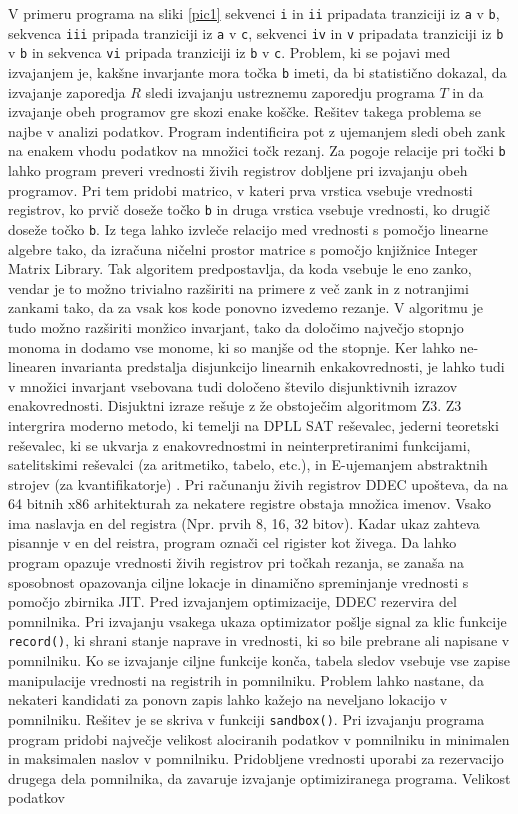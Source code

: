 \documentclass[a4paper, 12pt]{book}
\begin{document}
	V primeru programa na sliki \ref{pic1} sekvenci \texttt{i} in \texttt{ii} pripadata tranziciji iz \texttt{a} v \texttt{b}, sekvenca \texttt{iii} pripada tranziciji iz \texttt{a} v \texttt{c}, sekvenci \texttt{iv} in \texttt{v} pripadata tranziciji iz \texttt{b} v \texttt{b} in sekvenca \texttt{vi} pripada tranziciji iz \texttt{b} v \texttt{c}. Problem, ki se pojavi med izvajanjem je, kakšne invarjante mora točka \texttt{b} imeti, da bi statistično dokazal, da izvajanje zaporedja $R$ sledi izvajanju ustreznemu zaporedju programa $T$ in da izvajanje obeh programov gre skozi enake koščke. Rešitev takega problema se najbe v analizi podatkov. Program indentificira pot z ujemanjem sledi obeh zank na enakem vhodu podatkov na množici točk rezanj. Za pogoje relacije pri točki \texttt{b} lahko program preveri vrednosti živih registrov dobljene pri izvajanju obeh programov. Pri tem pridobi matrico, v kateri prva vrstica vsebuje vrednosti registrov, ko prvič doseže točko \texttt{b} in druga vrstica vsebuje vrednosti, ko drugič doseže točko \texttt{b}. Iz tega lahko izvleče relacijo med vrednosti s pomočjo linearne algebre tako, da izračuna ničelni prostor matrice s pomočjo knjižnice Integer Matrix Library. Tak algoritem predpostavlja, da koda vsebuje le eno zanko, vendar je to možno trivialno razširiti na primere z več zank in z notranjimi zankami tako, da za vsak kos kode ponovno izvedemo rezanje. V algoritmu je tudo možno razširiti monžico invarjant, tako da določimo največjo stopnjo monoma in dodamo vse monome, ki so manjše od the stopnje. Ker lahko ne-linearen invarianta predstalja disjunkcijo linearnih enkakovrednosti, je lahko tudi v množici invarjant vsebovana tudi določeno število disjunktivnih izrazov enakovrednosti. Disjuktni izraze rešuje z že obstoječim algoritmom Z3. Z3 intergrira moderno metodo, ki temelji na DPLL SAT reševalec, jederni teoretski reševalec, ki se ukvarja z enakovrednostmi in neinterpretiranimi funkcijami, satelitskimi reševalci (za aritmetiko, tabelo, etc.), in E-ujemanjem abstraktnih strojev (za kvantifikatorje) \cite{article3}. Pri računanju živih registrov DDEC upošteva, da na 64 bitnih x86 arhitekturah za nekatere registre obstaja množica imenov. Vsako ima naslavja en del registra (Npr. prvih 8, 16, 32 bitov). Kadar ukaz zahteva pisannje v en del reistra, program označi cel rigister kot živega. Da lahko program opazuje vrednosti živih registrov pri točkah rezanja, se zanaša na sposobnost opazovanja ciljne lokacje in dinamično spreminjanje vrednosti s pomočjo zbirnika JIT. Pred izvajanjem optimizacije, DDEC rezervira del pomnilnika. Pri izvajanju vsakega ukaza optimizator pošlje signal za klic funkcije \texttt{record()}, ki shrani stanje naprave in vrednosti, ki so bile prebrane ali napisane v pomnilniku. Ko se izvajanje ciljne funkcije konča, tabela sledov vsebuje vse zapise manipulacije vrednosti na registrih in pomnilniku. Problem lahko nastane, da nekateri kandidati za ponovn zapis lahko kažejo na neveljano lokacijo v pomnilniku. Rešitev je se skriva v funkciji \texttt{sandbox()}. Pri izvajanju programa program pridobi največje velikost alociranih podatkov v pomnilniku in minimalen in maksimalen naslov v pomnilniku. Pridobljene vrednosti uporabi za rezervacijo drugega dela pomnilnika, da zavaruje izvajanje optimiziranega programa. Velikost podatkov 
\end{document}

